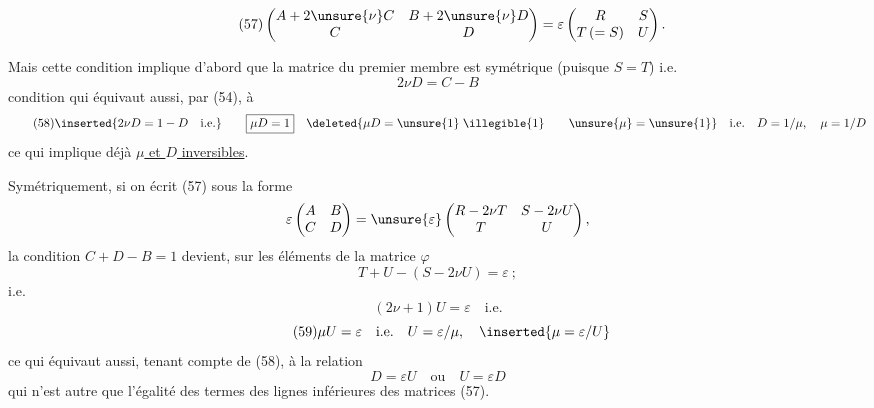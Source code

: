 \[
\tag{57}
\begin{pmatrix}
 A+2\unsure{\nu}C&B+2\unsure{\nu}D\\
 C&D
\end{pmatrix}
=\varepsilon\begin{pmatrix}R&S\\T\,(=S)&U\end{pmatrix}.
\]

Mais cette condition implique d'abord que la matrice du premier membre est symétrique (puisque $S=T$) i.e.
\[
2\nu D=C-B
\]
condition qui équivaut aussi, par (54), à
\[
\tag{58}
\inserted{2\nu D=1-D\quad\text{i.e.}}\qquad
\boxed{\mu D=1}\quad
\deleted{\mu D=\unsure{1}\;\illegible{1}\qquad\unsure{\mu}=\unsure{1}}\quad
\text{i.e.}\quad D=1/\mu,\quad\mu=1/D
\]
ce qui implique déjà \uline{$\mu$ et $D$ inversibles}.

Symétriquement, si on écrit (57) sous la forme
\[
\varepsilon\begin{pmatrix}A&B\\C&D\end{pmatrix}
=\unsure{\varepsilon}\begin{pmatrix}R-2\nu T&S-2\nu U\\T&U\end{pmatrix},
\]
la condition $C+D-B=1$ devient, sur les éléments de la matrice $\varphi$
\[
T+U-(S-2\nu U)=\varepsilon\ ;
\]
i.e.
\[
(2\nu+1)U=\varepsilon\quad\text{i.e.}
\]
\[
\tag{59}
\mu U=\varepsilon\quad\text{i.e.}\quad U=\varepsilon/\mu,
\quad\inserted{\mu=\varepsilon/U}
\]
ce qui équivaut aussi, tenant compte de (58), à la relation
\[
\tag{60}
D=\varepsilon U\quad\text{ou}\quad U=\varepsilon D
\]
qui n'est autre que l'égalité des termes des lignes inférieures des matrices (57).

